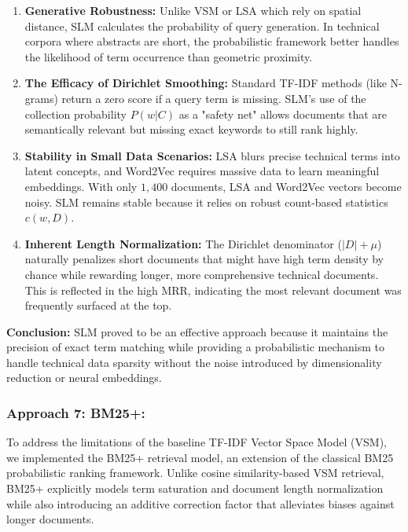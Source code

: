\documentclass{article}
\begin{document}
\begin{enumerate}
    \item \textbf{Generative Robustness:} Unlike VSM or LSA which rely on spatial distance, SLM calculates the probability of query generation. In technical corpora where abstracts are short, the probabilistic framework better handles the likelihood of term occurrence than geometric proximity.
    
    \item \textbf{The Efficacy of Dirichlet Smoothing:} Standard TF-IDF methods (like N-grams) return a zero score if a query term is missing. SLM's use of the collection probability $P(w|C)$ as a "safety net" allows documents that are semantically relevant but missing exact keywords to still rank highly.
    
    \item \textbf{Stability in Small Data Scenarios:} LSA blurs precise technical terms into latent concepts, and Word2Vec requires massive data to learn meaningful embeddings. With only $1,400$ documents, LSA and Word2Vec vectors become noisy. SLM remains stable because it relies on robust count-based statistics $c(w, D)$.

    \item \textbf{Inherent Length Normalization:} The Dirichlet denominator ($|D| + \mu$) naturally penalizes short documents that might have high term density by chance while rewarding longer, more comprehensive technical documents. This is reflected in the high MRR, indicating the most relevant document was frequently surfaced at the top.
\end{enumerate}

\textbf{Conclusion:} SLM proved to be an effective approach because it maintains the precision of exact term matching while providing a probabilistic mechanism to handle technical data sparsity without the noise introduced by dimensionality reduction or neural embeddings.




\subsubsection{Approach 7: BM25+:}

To address the limitations of the baseline TF-IDF Vector Space Model (VSM), we implemented the BM25+ retrieval model, an extension of the classical BM25 probabilistic ranking framework. Unlike cosine similarity-based VSM retrieval, BM25+ explicitly models term saturation and document length normalization while also introducing an additive correction factor that alleviates biases against longer documents.
\end{document}
